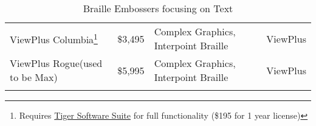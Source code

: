 \begin{longtable}[]{@{}
	>{\raggedright\arraybackslash}m{}
	>{\raggedright\arraybackslash}m{}
	>{\raggedright\arraybackslash}m{}
	>{\raggedright\arraybackslash}b{}@{}
	}
ViewPlus Columbia\footnote{\raggedright Requires \href{http://viewplus.com/product/tiger-software-suite8/}{Tiger Software Suite} for full functionality (\$195 for 1 year license)}                                                                                                                                & \$3,495                                                                                                                                                          & Complex Graphics, Interpoint Braille & ViewPlus                \\[1.0em]
ViewPlus Rogue\break (used to be Max)\footnotemark[\value{footnote}]& \$5,995                                                                                                                                                          & Complex Graphics, Interpoint Braille & ViewPlus                \\[1.0em]\hline
	\caption[ Braille Embossers focusing on Text]{ Braille Embossers focusing on Text}\label{tab:table16}
\end{longtable}

